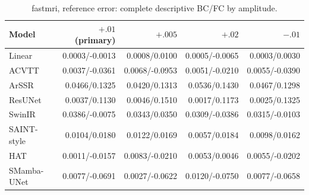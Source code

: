 \begin{table}[t]\centering\scriptsize

\caption{fastmri, reference error: complete descriptive BC/FC by amplitude.}

\begin{tabular}{lrrrr}\toprule Model & $+.01$ (primary) & $+.005$ & $+.02$ & $-.01$\\\midrule

Linear & 0.0003/-0.0013 & 0.0008/0.0100 & 0.0005/-0.0065 & 0.0003/0.0030\\

ACVTT & 0.0037/-0.0361 & 0.0068/-0.0953 & 0.0051/-0.0210 & 0.0055/-0.0390\\

ArSSR & 0.0466/0.1325 & 0.0420/0.1313 & 0.0536/0.1430 & 0.0467/0.1298\\

ResUNet & 0.0037/0.1130 & 0.0046/0.1510 & 0.0017/0.1173 & 0.0025/0.1325\\

SwinIR & 0.0386/-0.0075 & 0.0343/0.0350 & 0.0309/-0.0386 & 0.0315/-0.0103\\

SAINT-style & 0.0104/0.0180 & 0.0122/0.0169 & 0.0057/0.0184 & 0.0098/0.0162\\

HAT & 0.0011/-0.0157 & 0.0083/-0.0210 & 0.0053/0.0046 & 0.0055/-0.0202\\

SMamba-UNet & 0.0077/-0.0691 & 0.0027/-0.0622 & 0.0120/-0.0750 & 0.0077/-0.0658\\

\bottomrule\end{tabular}\end{table}

